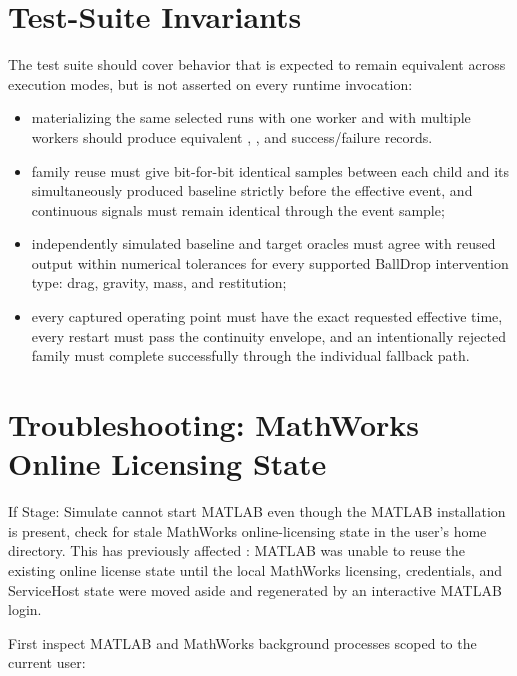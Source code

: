 \documentclass[11pt]{article}
\begin{document}
\section*{Test-Suite Invariants}

The test suite should cover behavior that is expected to remain equivalent across execution modes, but is not asserted on every runtime invocation:

\begin{itemize}
\item materializing the same selected runs with one worker and with multiple workers should produce equivalent , , and success/failure records.
\item family reuse must give bit-for-bit identical samples between each child and its simultaneously produced baseline strictly
before the effective event, and continuous signals must remain identical through the event sample;
\item independently simulated baseline and target oracles must agree with reused output within numerical tolerances for every
supported BallDrop intervention type: drag, gravity, mass, and restitution;
\item every captured operating point must have the exact requested effective time, every restart must pass the continuity envelope,
and an intentionally rejected family must complete successfully through the individual fallback path.
\end{itemize}

\section*{Troubleshooting: MathWorks Online Licensing State}

If Stage: Simulate cannot start MATLAB even though the MATLAB installation is present, check for stale MathWorks online-licensing state in the user's home directory.
This has previously affected : MATLAB was unable to reuse the existing online license state until the local MathWorks licensing, credentials, and ServiceHost state were moved aside and regenerated by an interactive MATLAB login.

First inspect MATLAB and MathWorks background processes scoped to the current user:

\end{document}
